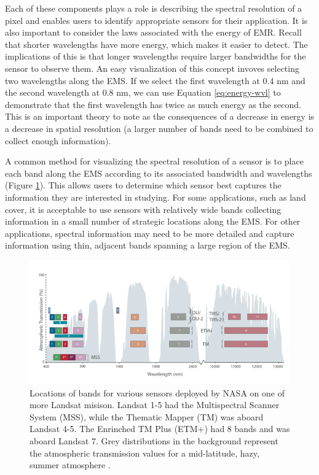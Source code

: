 \documentclass[
]{book}
\begin{document}
Each of these components plays a role is describing the spectral resolution of a pixel and enables users to identify appropriate sensors for their application. It is also important to consider the laws associated with the energy of EMR. Recall that shorter wavelengths have more energy, which makes it easier to detect. The implications of this is that longer wavelengths require larger bandwidths for the sensor to observe them. An easy visualization of this concept invoves selecting two wavelengths along the EMS. If we select the first wavelength at 0.4 nm and the second wavelength at 0.8 nm, we can use Equation \eqref{eq:energy-wvl} to demonstrate that the first wavelength has twice as much energy as the second. This is an important theory to note as the consequences of a decrease in energy is a decrease in spatial resolution (a larger number of bands need to be combined to collect enough information).

A common method for visualizing the spectral resolution of a sensor is to place each band along the EMS according to its associated bandwidth and wavelengths (Figure \ref{fig:11-landsat-bands}). This allows users to determine which sensor best captures the information they are interested in studying. For some applications, such as land cover, it is acceptable to use sensors with relatively wide bands collecting information in a small number of strategic locations along the EMS. For other applications, spectral information may need to be more detailed and capture information using thin, adjacent bands spanning a large region of the EMS.



\begin{figure}
\includegraphics[width=0.75\linewidth]{images/11-landsat-bands} \caption{Locations of bands for various sensors deployed by NASA on one of more Landsat misison. Landsat 1-5 had the Multispectral Scanner System (MSS), while the Thematic Mapper (TM) was aboard Landsat 4-5. The Enrinched TM Plus (ETM+) had 8 bands and was aboard Landsat 7. Grey distributions in the background represent the atmospheric transmission values for a mid-latitude, hazy, summer atmosphere \citep{nasa_atmospheric_nodate}.}\label{fig:11-landsat-bands}
\end{figure}
\end{document}
